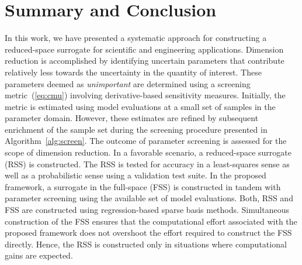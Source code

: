 \section{Summary and Conclusion}
\label{sec:disc}


In this work, we have presented a systematic approach for constructing a reduced-space
surrogate for scientific and engineering applications. Dimension reduction is accomplished
by identifying uncertain parameters that contribute relatively less towards the uncertainty
in the quantity of interest. These parameters deemed as \textit{unimportant} are determined
using a screening metric~(\eqref{eq:cmu}) involving derivative-based sensitivity
measures. Initially, the metric is estimated
using model evaluations at a small set of samples in the parameter domain. However, these
estimates are refined by subsequent enrichment of the sample set during the screening
procedure presented in Algorithm~\ref{alg:screen}. The outcome of parameter screening is
assessed for the scope of dimension reduction. In a favorable scenario, a reduced-space
surrogate (RSS) is constructed. The RSS is tested for accuracy in a least-squares sense
as well as a probabilistic sense using a validation test suite. In the proposed framework,
a surrogate in the full-space (FSS) is constructed in tandem with parameter screening using
the available set of model evaluations. Both, RSS and FSS are
constructed using regression-based sparse basis methods. Simultaneous construction
of the FSS ensures that the computational effort associated with the proposed framework
does not overshoot the effort required to construct the FSS directly.
Hence, the RSS is constructed only in situations where computational gains are
expected. 


